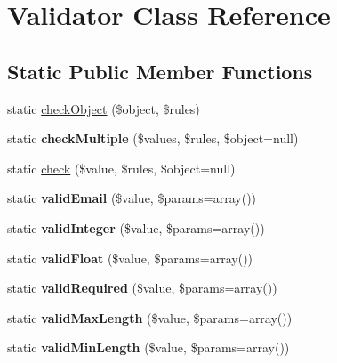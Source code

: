 \hypertarget{classValidator}{
\section{Validator Class Reference}
\label{classValidator}
}
\subsection*{Static Public Member Functions}
\begin{DoxyCompactItemize}
\item 
static \hyperlink{classValidator_a383fabe41373911648b022affce06392}{checkObject} (\$object, \$rules)
\item 
\hypertarget{classValidator_a7dff91acc69f50842aba95ae5ee25608}{
static {\bfseries checkMultiple} (\$values, \$rules, \$object=null)}
\label{classValidator_a7dff91acc69f50842aba95ae5ee25608}

\item 
static \hyperlink{classValidator_a7a1061f984896a168eed57d1d34fb433}{check} (\$value, \$rules, \$object=null)
\item 
\hypertarget{classValidator_aca327f59e0750df211529c61e54974b7}{
static {\bfseries validEmail} (\$value, \$params=array())}
\label{classValidator_aca327f59e0750df211529c61e54974b7}

\item 
\hypertarget{classValidator_abcfda5ed6af8a7338708b77c030aec55}{
static {\bfseries validInteger} (\$value, \$params=array())}
\label{classValidator_abcfda5ed6af8a7338708b77c030aec55}

\item 
\hypertarget{classValidator_ad7430c0c6f3e368ce9b3cb540564de2c}{
static {\bfseries validFloat} (\$value, \$params=array())}
\label{classValidator_ad7430c0c6f3e368ce9b3cb540564de2c}

\item 
\hypertarget{classValidator_ab0d9ddba42a629e59d6a562160b388a4}{
static {\bfseries validRequired} (\$value, \$params=array())}
\label{classValidator_ab0d9ddba42a629e59d6a562160b388a4}

\item 
\hypertarget{classValidator_a0b13d0bb343bf7a3e8b20e99506eac95}{
static {\bfseries validMaxLength} (\$value, \$params=array())}
\label{classValidator_a0b13d0bb343bf7a3e8b20e99506eac95}

\item 
\hypertarget{classValidator_aeacd793244066335aeda16fa1b398228}{
static {\bfseries validMinLength} (\$value, \$params=array())}
\label{classValidator_aeacd793244066335aeda16fa1b398228}

\end{DoxyCompactItemize}
